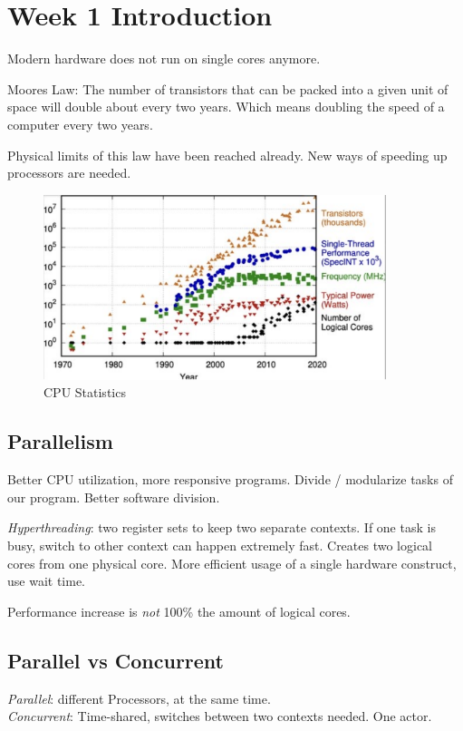 \section{Week 1 Introduction}

Modern hardware does not run on single cores anymore.

Moores Law: The number of transistors that can be packed into a given unit of space will double about every two years. Which means doubling the speed of a computer every two years.

Physical limits of this law have been reached already. New ways of speeding up processors are needed.

\begin{figure}
    \centering
    \includegraphics*[width=10cm]{res/01-stats.png}
    \caption{CPU Statistics}
\end{figure}

\subsection{Parallelism}
Better CPU utilization, more responsive programs. Divide / modularize tasks of our program. Better software division.

\emph{Hyperthreading}: two register sets to keep two separate contexts. If one task is busy, switch to other context can happen extremely fast. Creates two logical cores from one physical core. More efficient usage of a single hardware construct, use wait time.

Performance increase is \emph{not} 100\% the amount of logical cores.

\subsection{Parallel vs Concurrent}
\emph{Parallel}: different Processors, at the same time. \\
\emph{Concurrent}: Time-shared, switches between two contexts needed. One actor.

